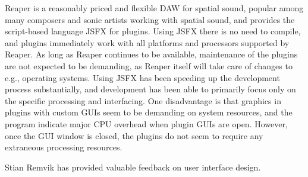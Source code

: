 \documentclass{article}
\begin{document}
Reaper is a reasonably priced and flexible DAW for spatial sound, popular among many composers and sonic artists working with spatial sound, and provides the script-based language JSFX for plugins.
Using JSFX there is no need to compile, and plugins immediately work with all platforms and processors supported by Reaper.
As long as Reaper continues to be available, maintenance of the plugins are not expected to be demanding, as Reaper itself will take care of changes to e.g., operating systems.
Using JSFX has been speeding up the development process substantially, and development has been able to primarily focus only on the specific processing and interfacing.
One disadvantage is that graphics in plugins with custom GUIs seem to be demanding on system resources, and the program indicate major CPU overhead when plugin GUIs are open.
However, once the GUI window is closed, the plugins do not seem to require any extraneous processing resources.




\begin{acknowledgments}
Stian Remvik has provided valuable feedback on user interface design.
\end{acknowledgments} 


\end{document}
